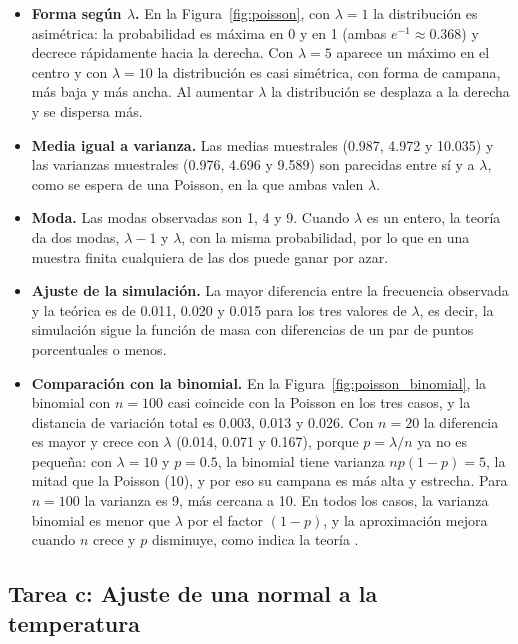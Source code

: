 \documentclass[11pt,letterpaper]{article}
\begin{document}
\begin{itemize}
    \item \textbf{Forma según $\lambda$.} En la Figura~\ref{fig:poisson}, con $\lambda = 1$ la distribución es asimétrica: la probabilidad es máxima en 0 y en 1 (ambas $e^{-1} \approx 0.368$) y decrece rápidamente hacia la derecha. Con $\lambda = 5$ aparece un máximo en el centro y con $\lambda = 10$ la distribución es casi simétrica, con forma de campana, más baja y más ancha. Al aumentar $\lambda$ la distribución se desplaza a la derecha y se dispersa más.
    \item \textbf{Media igual a varianza.} Las medias muestrales (0.987, 4.972 y 10.035) y las varianzas muestrales (0.976, 4.696 y 9.589) son parecidas entre sí y a $\lambda$, como se espera de una Poisson, en la que ambas valen $\lambda$.
    \item \textbf{Moda.} Las modas observadas son 1, 4 y 9. Cuando $\lambda$ es un entero, la teoría da dos modas, $\lambda - 1$ y $\lambda$, con la misma probabilidad, por lo que en una muestra finita cualquiera de las dos puede ganar por azar.
    \item \textbf{Ajuste de la simulación.} La mayor diferencia entre la frecuencia observada y la teórica es de 0.011, 0.020 y 0.015 para los tres valores de $\lambda$, es decir, la simulación sigue la función de masa con diferencias de un par de puntos porcentuales o menos.
    \item \textbf{Comparación con la binomial.} En la Figura~\ref{fig:poisson_binomial}, la binomial con $n = 100$ casi coincide con la Poisson en los tres casos, y la distancia de variación total es 0.003, 0.013 y 0.026. Con $n = 20$ la diferencia es mayor y crece con $\lambda$ (0.014, 0.071 y 0.167), porque $p = \lambda/n$ ya no es pequeña: con $\lambda = 10$ y $p = 0.5$, la binomial tiene varianza $np(1-p) = 5$, la mitad que la Poisson (10), y por eso su campana es más alta y estrecha. Para $n = 100$ la varianza es 9, más cercana a 10. En todos los casos, la varianza binomial es menor que $\lambda$ por el factor $(1 - p)$, y la aproximación mejora cuando $n$ crece y $p$ disminuye, como indica la teoría \parencite{tecnm2026_documento_fuente}.
\end{itemize}

\subsection{Tarea c: Ajuste de una normal a la temperatura}
\end{document}
